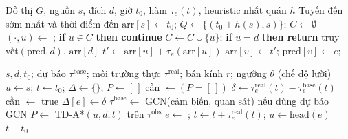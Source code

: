 \begin{algorithm}[H]
\caption{TD-A* (nhãn là thời điểm đến)}\label{alg:tdastar}
\begin{algorithmic}[1]
\Require Đồ thị $G$, nguồn $s$, đích $d$, giờ $t_0$, hàm $\tau_e(t)$, heuristic nhất quán $h$
\Ensure Tuyến đến sớm nhất và thời điểm đến
\State $\text{arr}[s]\gets t_0$; $Q\gets\{(t_0+h(s),s)\}$; $C\gets\emptyset$
  \State $(\cdot,u)\gets$ ; \textbf{if} $u\in C$ \textbf{then continue}
  \State $C\gets C\cup\{u\}$; \textbf{if} $u=d$ \textbf{then return} truy vết$(\text{pred},d)$, $\text{arr}[d]$
    \State $t'\gets\text{arr}[u]+\tau_e(\text{arr}[u])$ 
      \State $\text{arr}[v]\gets t'$; $\text{pred}[v]\gets e$; 
    \EndIf
  \EndFor
\EndWhile
\end{algorithmic}
\end{algorithm}

\begin{algorithm}[H]
\caption{Replan (tuỳ chọn lười) với quan sát cục bộ và dự báo GCN}\label{alg:replan}
\begin{algorithmic}[1]
\Require $s,d,t_0$; dự báo $\tau^{\text{base}}$; môi trường thực $\tau^{\text{real}}$; bán kính $r$; ngưỡng $\theta$ (chế độ lười)
\State $u\gets s$; $t\gets t_0$; $\Delta\gets\{\}$; $P\gets[\,]$
  \State cần $\gets (P=[\,])$ 
    \State $\delta\gets\tau^{\text{real}}_e(t)-\tau^{\text{base}}_e(t)$ \Comment{\eqref{eq:delta}}
     cần $\gets$ true \EndIf \Comment{\eqref{eq:lazy}}
    \State $\Delta[e]\gets\delta$
  \EndFor
    \State $\tau^{\text{base}}\gets$ GCN(cảm biến, quan sát) nếu dùng dự báo GCN \Comment{\eqref{eq:gcn}}
    \State $P\gets$ TD-A*$(u,d,t)$ trên $\tau^{\text{obs}}$ \Comment{\eqref{eq:tau-obs}}
  \EndIf
  \State $e\gets$ ; $t\gets t+\tau^{\text{real}}_e(t)$; $u\gets\text{head}(e)$
\EndWhile
\State \Return $t-t_0$
\end{algorithmic}
\end{algorithm}


